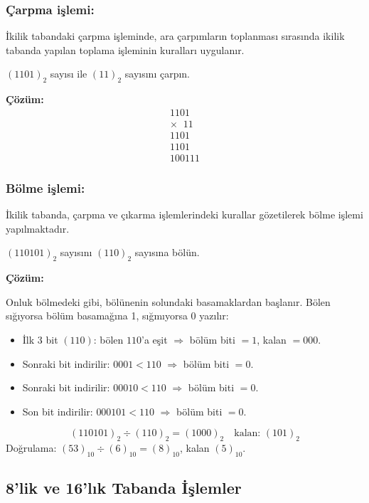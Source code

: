 \subsubsection*{Çarpma işlemi:} İkilik tabandaki çarpma işleminde, ara çarpımların toplanması sırasında ikilik tabanda yapılan toplama işleminin kuralları uygulanır.

\begin{ornek}[A.7]
$(1101)_2$ sayısı ile $(11)_2$ sayısını çarpın.

\textbf{Çözüm:}
\[
\begin{array}{r}
1101 \\
\times \;\; 11 \\
\hline
1101 \\
1101\phantom{0} \\
\hline
100111
\end{array}
\]
\end{ornek}

\subsubsection*{Bölme işlemi:} İkilik tabanda, çarpma ve çıkarma işlemlerindeki kurallar gözetilerek bölme işlemi yapılmaktadır.

\begin{ornek}[A.8]
$(110101)_2$ sayısını $(110)_2$ sayısına bölün.

\textbf{Çözüm:}

Onluk bölmedeki gibi, bölünenin solundaki basamaklardan başlanır. Bölen sığıyorsa bölüm basamağına 1, sığmıyorsa 0 yazılır:
\begin{itemize}[nosep]
    \item İlk 3 bit $(110)$: bölen $110$'a eşit $\Rightarrow$ bölüm biti $= 1$, kalan $= 000$.
    \item Sonraki bit indirilir: $0001 < 110$ $\Rightarrow$ bölüm biti $= 0$.
    \item Sonraki bit indirilir: $00010 < 110$ $\Rightarrow$ bölüm biti $= 0$.
    \item Son bit indirilir: $000101 < 110$ $\Rightarrow$ bölüm biti $= 0$.
\end{itemize}
\[
(110101)_2 \div (110)_2 = (1000)_2 \quad \text{kalan: } (101)_2
\]
Doğrulama: $(53)_{10} \div (6)_{10} = (8)_{10}$, kalan $(5)_{10}$.
\end{ornek}


\subsection{8'lik ve 16'lık Tabanda İşlemler}

